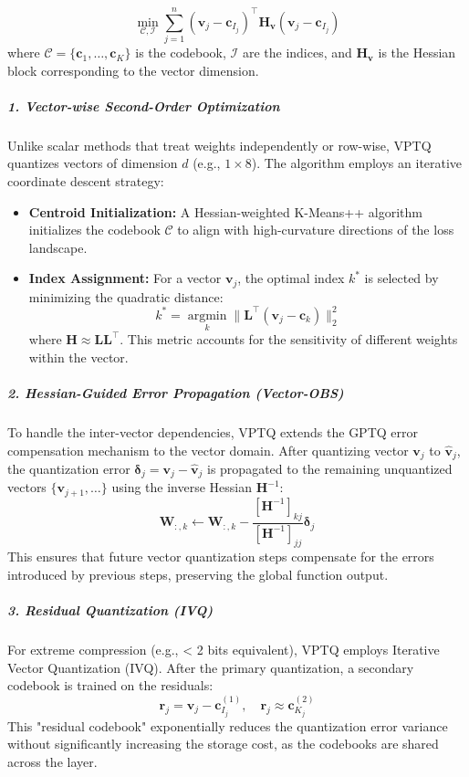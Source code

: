 \documentclass[11pt,a4paper]{article}
\theoremstyle{definition}
\begin{document}
\begin{equation}
    \min_{\mathcal{C}, \mathcal{I}} \sum_{j=1}^n (\bm{v}_j - \bm{c}_{I_j})^\top \bm{H}_{\bm{v}} (\bm{v}_j - \bm{c}_{I_j})
\end{equation}
where $\mathcal{C} = \{ \bm{c}_1, \dots, \bm{c}_K \}$ is the codebook, $\mathcal{I}$ are the indices, and $\bm{H}_{\bm{v}}$ is the Hessian block corresponding to the vector dimension.

\subparagraph{1. Vector-wise Second-Order Optimization}
Unlike scalar methods that treat weights independently or row-wise, VPTQ quantizes vectors of dimension $d$ (e.g., $1 \times 8$). The algorithm employs an iterative coordinate descent strategy:
\begin{itemize}
    \item \textbf{Centroid Initialization:} A Hessian-weighted K-Means++ algorithm initializes the codebook $\mathcal{C}$ to align with high-curvature directions of the loss landscape.
    \item \textbf{Index Assignment:} For a vector $\bm{v}_j$, the optimal index $k^*$ is selected by minimizing the quadratic distance:
    \begin{equation}
        k^* = \operatorname*{argmin}_{k} \|\bm{L}^\top (\bm{v}_j - \bm{c}_k)\|_2^2
    \end{equation}
    where $\bm{H} \approx \bm{L}\bm{L}^\top$. This metric accounts for the sensitivity of different weights within the vector.
\end{itemize}

\subparagraph{2. Hessian-Guided Error Propagation (Vector-OBS)}
To handle the inter-vector dependencies, VPTQ extends the GPTQ error compensation mechanism to the vector domain. After quantizing vector $\bm{v}_j$ to $\hat{\bm{v}}_j$, the quantization error $\bm{\delta}_j = \bm{v}_j - \hat{\bm{v}}_j$ is propagated to the remaining unquantized vectors $\{\bm{v}_{j+1}, \dots \}$ using the inverse Hessian $\bm{H}^{-1}$:
\begin{equation}
    \bm{W}_{:, k} \leftarrow \bm{W}_{:, k} - \frac{[\bm{H}^{-1}]_{kj}}{[\bm{H}^{-1}]_{jj}} \bm{\delta}_j
\end{equation}
This ensures that future vector quantization steps compensate for the errors introduced by previous steps, preserving the global function output.

\subparagraph{3. Residual Quantization (IVQ)}
For extreme compression (e.g., < 2 bits equivalent), VPTQ employs Iterative Vector Quantization (IVQ). After the primary quantization, a secondary codebook is trained on the residuals:
\begin{equation}
    \bm{r}_j = \bm{v}_j - \bm{c}^{(1)}_{I_j}, \quad \bm{r}_j \approx \bm{c}^{(2)}_{K_j}
\end{equation}
This "residual codebook" exponentially reduces the quantization error variance without significantly increasing the storage cost, as the codebooks are shared across the layer.
\end{document}
